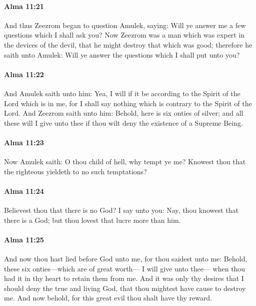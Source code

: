 		\paragraph{Alma 11:21} %
			\label{ALMA-11-21}

			And thus Zeezrom began to question Amulek, saying:
			Will ye answer me a few questions which I shall ask you?
			Now Zeezrom was a man which was expert in the devices of the devil,
			that he might destroy that which was good;
			therefore he saith unto Amulek:
			Will ye answer the questions which I shall put unto you?

		\paragraph{Alma 11:22} %
			\label{ALMA-11-22}

			And Amulek saith unto him:
			Yea, I will if it be according to the Spirit of the Lord which is in me,
			for I shall say nothing which is contrary to the Spirit of the Lord.
			And Zeezrom saith unto him:
			Behold, here is six onties of silver;
			and all these will I give unto thee
			if thou wilt deny the existence of a Supreme Being.

		\paragraph{Alma 11:23} %
			\label{ALMA-11-23}

			Now Amulek saith:
			O thou child of hell, why tempt ye me?
			Knowest thou that the righteous yieldeth to no such temptations?

		\paragraph{Alma 11:24} %
			\label{ALMA-11-24}

			Believest thou that there is no God?
			I say unto you:
			Nay, thou knowest that there is a God;
			but thou lovest that lucre more than him.

		\paragraph{Alma 11:25} %
			\label{ALMA-11-25}

			And now thou hast lied before God unto me,
			for thou saidest unto me:
			Behold, these six onties---which are of great worth---
			I will give unto thee---
			when thou had it in thy heart to retain them from me.
			And it was only thy desires that I should deny the true and living God,
			that thou mightest have cause to destroy me.
			And now behold, for this great evil thou shalt have thy reward.

